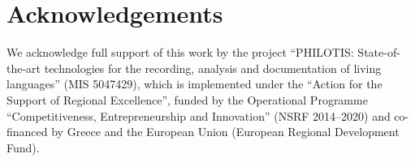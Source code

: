 \documentclass[output=paper,colorlinks,citecolor=brown]{langscibook}
\begin{document}
\section*{Acknowledgements}

We acknowledge full support of this work by the project “PHILOTIS: State-of-the-art technologies for the recording, analysis and documentation of living languages” (MIS 5047429), which is implemented under the “Action for the Support of Regional Excellence”, funded by the Operational Programme “Competitiveness, Entrepreneurship and Innovation” (NSRF 2014--2020) and co-financed by Greece and the European Union (European Regional Development Fund).



 \ea \label{ex:lvc1}
\end{document}
